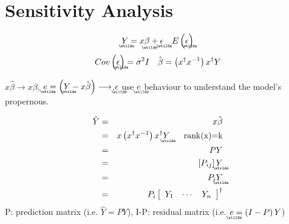 \documentclass{article}
\begin{document}
\setcounter{part}{6} \setcounter{page}{38}

\bigskip

\part{Sensitivity Analysis}

\begin{equation*}
\underaccent{\wtilde}{Y}%
=x%
\underaccent{\wtilde}{\beta}%
+%
\underaccent{\wtilde}{\epsilon}%
\quad E\left( 
\underaccent{\wtilde}{\epsilon}%
\right)
\end{equation*}%
\begin{equation*}
Cov\left( 
\underaccent{\wtilde}{\epsilon}%
\right) =\sigma ^{2}I\quad \hat{\beta}=\left( x^{\dagger }x^{-1}\right)
x^{\dagger }Y
\end{equation*}

$x\hat{\beta}\longrightarrow x\beta $, $%
\underaccent{\wtilde}{e}%
=\left( 
\underaccent{\wtilde}{Y}%
-x\hat{\beta}\right) \longrightarrow $,$%
\underaccent{\wtilde}{\epsilon}%
$ use $%
\underaccent{\wtilde}{e}%
$ behaviour to understand the model's propernous.

\begin{eqnarray*}
\hat{Y} &=&x\hat{\beta} \\
&=&x\left( x^{\dagger }x^{-1}\right) x^{\dagger }%
\underaccent{\wtilde}{Y}%
\quad \text{rank(x)=k} \\
&=&PY \\
&=&\left[ P_{ij}\right] 
\underaccent{\wtilde}{Y}
\\
&=&P_{i}%
\underaccent{\wtilde}{Y}
\\
&=&P_{i}\left[ 
\begin{array}{ccc}
Y_{1} & \cdots  & Y_{n}%
\end{array}%
\right] ^{\dagger }
\end{eqnarray*}%
P: prediction matrix (i.e. $\hat{Y}=PY$), I-P: residual matrix (i.e. $%
\underaccent{\wtilde}{e}%
=\left( I-P\right) Y$)
\end{document}
